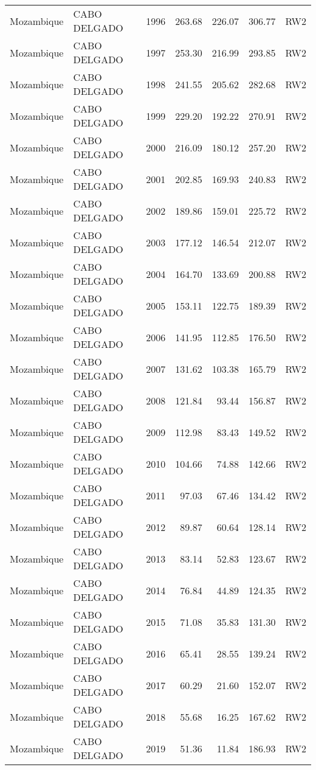 \begin{longtable}{lllrrrl}
  Mozambique & CABO DELGADO & 1996 & 263.68 & 226.07 & 306.77 & RW2 \\ 
  Mozambique & CABO DELGADO & 1997 & 253.30 & 216.99 & 293.85 & RW2 \\ 
  Mozambique & CABO DELGADO & 1998 & 241.55 & 205.62 & 282.68 & RW2 \\ 
  Mozambique & CABO DELGADO & 1999 & 229.20 & 192.22 & 270.91 & RW2 \\ 
  Mozambique & CABO DELGADO & 2000 & 216.09 & 180.12 & 257.20 & RW2 \\ 
  Mozambique & CABO DELGADO & 2001 & 202.85 & 169.93 & 240.83 & RW2 \\ 
  Mozambique & CABO DELGADO & 2002 & 189.86 & 159.01 & 225.72 & RW2 \\ 
  Mozambique & CABO DELGADO & 2003 & 177.12 & 146.54 & 212.07 & RW2 \\ 
  Mozambique & CABO DELGADO & 2004 & 164.70 & 133.69 & 200.88 & RW2 \\ 
  Mozambique & CABO DELGADO & 2005 & 153.11 & 122.75 & 189.39 & RW2 \\ 
  Mozambique & CABO DELGADO & 2006 & 141.95 & 112.85 & 176.50 & RW2 \\ 
  Mozambique & CABO DELGADO & 2007 & 131.62 & 103.38 & 165.79 & RW2 \\ 
  Mozambique & CABO DELGADO & 2008 & 121.84 & 93.44 & 156.87 & RW2 \\ 
  Mozambique & CABO DELGADO & 2009 & 112.98 & 83.43 & 149.52 & RW2 \\ 
  Mozambique & CABO DELGADO & 2010 & 104.66 & 74.88 & 142.66 & RW2 \\ 
  Mozambique & CABO DELGADO & 2011 & 97.03 & 67.46 & 134.42 & RW2 \\ 
  Mozambique & CABO DELGADO & 2012 & 89.87 & 60.64 & 128.14 & RW2 \\ 
  Mozambique & CABO DELGADO & 2013 & 83.14 & 52.83 & 123.67 & RW2 \\ 
  Mozambique & CABO DELGADO & 2014 & 76.84 & 44.89 & 124.35 & RW2 \\ 
  Mozambique & CABO DELGADO & 2015 & 71.08 & 35.83 & 131.30 & RW2 \\ 
  Mozambique & CABO DELGADO & 2016 & 65.41 & 28.55 & 139.24 & RW2 \\ 
  Mozambique & CABO DELGADO & 2017 & 60.29 & 21.60 & 152.07 & RW2 \\ 
  Mozambique & CABO DELGADO & 2018 & 55.68 & 16.25 & 167.62 & RW2 \\ 
  Mozambique & CABO DELGADO & 2019 & 51.36 & 11.84 & 186.93 & RW2 \\ 

\end{longtable}
